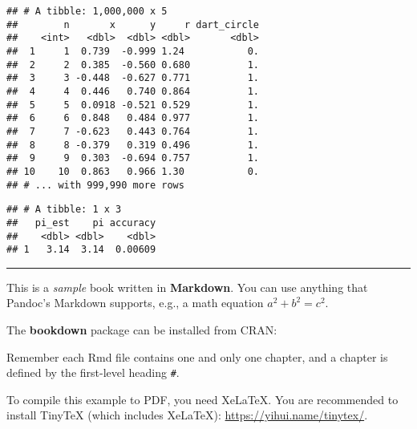 \documentclass[]{book}
\newenvironment{Shaded}{\begin{snugshade}}{\end{snugshade}}
\newcommand{\DataTypeTok}[1]{\textcolor[rgb]{0.13,0.29,0.53}{#1}}
\newcommand{\DecValTok}[1]{\textcolor[rgb]{0.00,0.00,0.81}{#1}}
\newcommand{\KeywordTok}[1]{\textcolor[rgb]{0.13,0.29,0.53}{\textbf{#1}}}
\newcommand{\NormalTok}[1]{#1}
\newcommand{\OperatorTok}[1]{\textcolor[rgb]{0.81,0.36,0.00}{\textbf{#1}}}
\newcommand{\StringTok}[1]{\textcolor[rgb]{0.31,0.60,0.02}{#1}}
\theoremstyle{definition}
\theoremstyle{definition}
\theoremstyle{definition}
\theoremstyle{remark}
\begin{document}
\begin{verbatim}
## # A tibble: 1,000,000 x 5
##        n       x      y     r dart_circle
##    <int>   <dbl>  <dbl> <dbl>       <dbl>
##  1     1  0.739  -0.999 1.24           0.
##  2     2  0.385  -0.560 0.680          1.
##  3     3 -0.448  -0.627 0.771          1.
##  4     4  0.446   0.740 0.864          1.
##  5     5  0.0918 -0.521 0.529          1.
##  6     6  0.848   0.484 0.977          1.
##  7     7 -0.623   0.443 0.764          1.
##  8     8 -0.379   0.319 0.496          1.
##  9     9  0.303  -0.694 0.757          1.
## 10    10  0.863   0.966 1.30           0.
## # ... with 999,990 more rows
\end{verbatim}

\begin{Shaded}
\end{Shaded}

\begin{verbatim}
## # A tibble: 1 x 3
##   pi_est    pi accuracy
##    <dbl> <dbl>    <dbl>
## 1   3.14  3.14  0.00609
\end{verbatim}

\begin{center}\rule{0.5\linewidth}{\linethickness}\end{center}

This is a \emph{sample} book written in \textbf{Markdown}. You can use
anything that Pandoc's Markdown supports, e.g., a math equation
\(a^2 + b^2 = c^2\).

The \textbf{bookdown} package can be installed from CRAN:

Remember each Rmd file contains one and only one chapter, and a chapter
is defined by the first-level heading \texttt{\#}.

To compile this example to PDF, you need XeLaTeX. You are recommended to
install TinyTeX (which includes XeLaTeX):
\url{https://yihui.name/tinytex/}.
\end{document}
